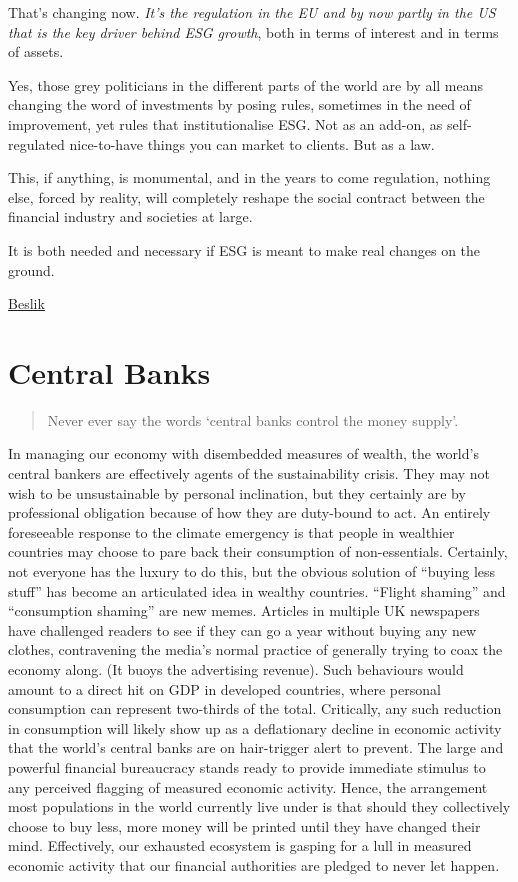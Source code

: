 \documentclass[
]{book}
\begin{document}
That's changing now. \emph{It's the regulation in the EU and by now partly in the US that is the key driver behind ESG growth}, both in terms of interest and in terms of assets.

Yes, those grey politicians in the different parts of the world are by all means changing the word of investments by posing rules, sometimes in the need of improvement, yet rules that institutionalise ESG. Not as an add-on, as self-regulated nice-to-have things you can market to clients. But as a law.

This, if anything, is monumental, and in the years to come regulation, nothing else, forced by reality, will completely reshape the social contract between the financial industry and societies at large.

It is both needed and necessary if ESG is meant to make real changes on the ground.

\href{https://esgonasunday.substack.com/p/week-19-esg-on-a-sunday-turns-1-}{Beslik}

\hypertarget{central-banks-1}{%
\chapter{Central Banks}\label{central-banks-1}}

\begin{quote}
Never ever say the words `central banks control the money supply'.
\end{quote}

In managing our economy with disembedded measures of wealth,
the world's central bankers are effectively agents of the sustainability crisis. They may not
wish to be unsustainable by personal inclination, but they certainly are by professional
obligation because of how they are duty-bound to act.
An entirely foreseeable response to the climate emergency is that people in wealthier
countries may choose to pare back their consumption of non-essentials. Certainly, not
everyone has the luxury to do this, but the obvious solution of ``buying less stuff'' has become
an articulated idea in wealthy countries. ``Flight shaming'' and ``consumption shaming'' are new
memes. Articles in multiple UK newspapers have challenged readers to see if they can go a
year without buying any new clothes, contravening the media's normal practice of generally
trying to coax the economy along. (It buoys the advertising revenue).
Such behaviours would amount to a direct hit on GDP in developed countries, where personal
consumption can represent two-thirds of the total. Critically, any such reduction in
consumption will likely show up as a deflationary decline in economic activity that the world's
central banks are on hair-trigger alert to prevent. The large and powerful financial
bureaucracy stands ready to provide immediate stimulus to any perceived flagging of
measured economic activity.
Hence, the arrangement most populations in the world currently live under is that should they
collectively choose to buy less, more money will be printed until they have changed their
mind. Effectively, our exhausted ecosystem is gasping for a lull in measured economic activity
that our financial authorities are pledged to never let happen.
\end{document}
